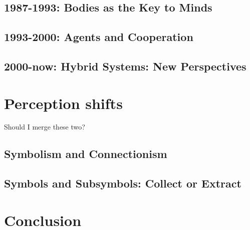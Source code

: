 \documentclass{article}
\begin{document}
\subsection{1987-1993: Bodies as the Key to Minds}


\subsection{1993-2000: Agents and Cooperation}


\subsection{2000-now: Hybrid Systems: New Perspectives}


\section{Perception shifts}
Should I merge these two?
\subsection{Symbolism and Connectionism}
\subsection{Symbols and Subsymbols: Collect or Extract}

\section{Conclusion}

\printbibliography
\end{document}
